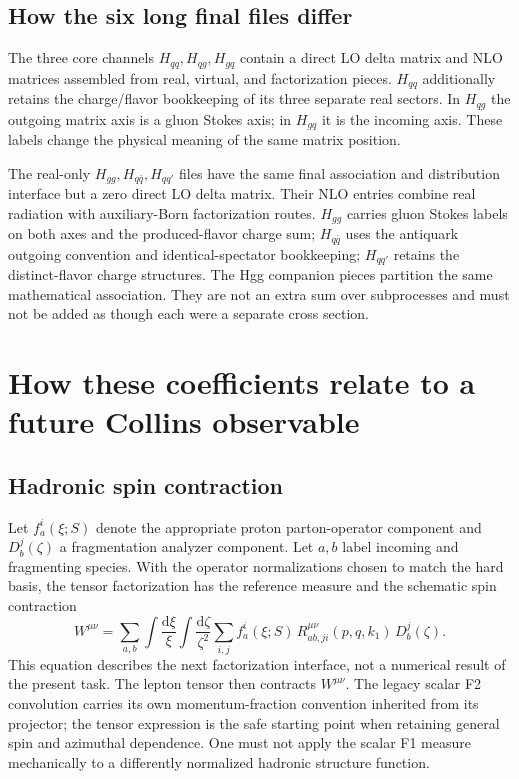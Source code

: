 \documentclass[11pt,a4paper]{article}
\newcommand{\dd}{\mathrm{d}}
\begin{document}
\subsection{How the six long final files differ}
The three core channels $H_{qq},H_{qg},H_{gq}$ contain a direct LO delta matrix and NLO matrices assembled from real, virtual, and factorization pieces. $H_{qq}$ additionally retains the charge/flavor bookkeeping of its three separate real sectors. In $H_{qg}$ the outgoing matrix axis is a gluon Stokes axis; in $H_{gq}$ it is the incoming axis. These labels change the physical meaning of the same matrix position.

The real-only $H_{gg},H_{q\bar q},H_{qq'}$ files have the same final association and distribution interface but a zero direct LO delta matrix. Their NLO entries combine real radiation with auxiliary-Born factorization routes. $H_{gg}$ carries gluon Stokes labels on both axes and the produced-flavor charge sum; $H_{q\bar q}$ uses the antiquark outgoing convention and identical-spectator bookkeeping; $H_{qq'}$ retains the distinct-flavor charge structures. The Hgg companion pieces partition the same mathematical association. They are not an extra sum over subprocesses and must not be added as though each were a separate cross section.

\section{How these coefficients relate to a future Collins observable}
\subsection{Hadronic spin contraction}
Let $f_a^i(\xi;S)$ denote the appropriate proton parton-operator component and $D_b^j(\zeta)$ a fragmentation analyzer component. Let $a,b$ label incoming and fragmenting species. With the operator normalizations chosen to match the hard basis, the tensor factorization has the reference measure and the schematic spin contraction
\begin{equation}
 W^{\mu\nu}=\sum_{a,b}\int\frac{\dd\xi}{\xi}
 \int\frac{\dd\zeta}{\zeta^2}
 \sum_{i,j} f_a^i(\xi;S)\,
 R^{\mu\nu}_{ab,ji}(p,q,k_1)\,D_b^j(\zeta).
\end{equation}
This equation describes the next factorization interface, not a numerical result of the present task. The lepton tensor then contracts $W^{\mu\nu}$. The legacy scalar F2 convolution carries its own momentum-fraction convention inherited from its projector; the tensor expression is the safe starting point when retaining general spin and azimuthal dependence. One must not apply the scalar F1 measure mechanically to a differently normalized hadronic structure function.
\end{document}
